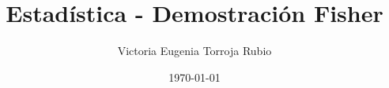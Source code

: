 \documentclass{article}
\begin{document}
\title{Estadística - Demostración Fisher}
\author{Victoria Eugenia Torroja Rubio}
\date{\today}

\maketitle
\end{document}
